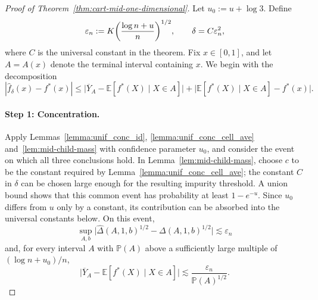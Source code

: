 \documentclass[11pt]{article}
\theoremstyle{plain}
\theoremstyle{definition}
\theoremstyle{remark}
\theoremstyle{plain}
\DeclarePairedDelimiter{\paren}{(}{)}
\renewcommand{\P}{\mathbb{P}}
\newcommand{\E}{\mathbb{E}}
\newcommand{\1}{\mathbbm{1}}
\begin{document}
\begin{proof}[Proof of Theorem~\ref{thm:cart-mid-one-dimensional}]
Let $u_0:=u+\log 3$.
Define
\[
\varepsilon_n
:=
K
\paren*{\frac{\log n+u}{n}}^{1/2},
\qquad
\delta=C\varepsilon_n^2,
\]
where $C$ is the universal constant in the theorem. Fix $x\in[0,1]$,
and let $A=A(x)$ denote the terminal interval containing $x$. We begin
with the decomposition
\[
|\hat f_\delta(x)-f^*(x)|
\le
\bigl|\overline Y_A-\E[f^*(X)\mid X\in A]\bigr|
+
\bigl|\E[f^*(X)\mid X\in A]-f^*(x)\bigr|.
\]

\paragraph{Step 1: Concentration.}
Apply Lemmas~\ref{lemma:unif_conc_id},
\ref{lemma:unif_conc_cell_ave}
and~\ref{lem:mid-child-mass} with confidence parameter $u_0$, and
consider the event on which all three conclusions hold. In
Lemma~\ref{lem:mid-child-mass}, choose $c$ to be the constant required
by Lemma~\ref{lemma:unif_conc_cell_ave}; the constant $C$ in $\delta$
can be chosen large enough for the resulting impurity threshold.
A union bound shows that this common event has probability at least
$1-e^{-u}$. Since $u_0$ differs from $u$ only by a constant, its
contribution can be absorbed into the universal constants below. On
this event,
\begin{equation} \label{eq:1d-imp_dec_conc}
\sup_{A,b}
\bigl|\widehat\Delta(A,1,b)^{1/2}-\Delta(A,1,b)^{1/2}\bigr|
\lesssim \varepsilon_n
\end{equation}
and, for every interval $A$ with $\P(A)$ above a sufficiently large multiple of $(\log n+u_0)/n$,
\begin{equation} \label{eq:1d-cell-ave-conc}
    \bigl|\overline Y_A-\E[f^*(X)\mid X\in A]\bigr|
\lesssim
\frac{\varepsilon_n}{\P(A)^{1/2}}.
\end{equation}



\end{proof}
\end{document}
